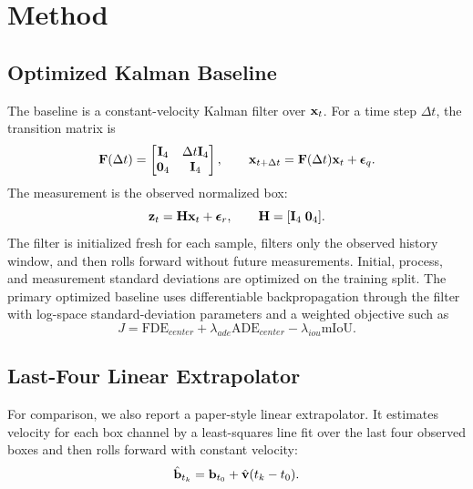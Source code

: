 \section{Method}

\subsection{Optimized Kalman Baseline}

The baseline is a constant-velocity Kalman filter over $\mathbf{x}_t$. For a time step $\Delta t$, the transition matrix is
\begin{equation}
  \mathbf{F}(\Delta t) =
  \begin{bmatrix}
    \mathbf{I}_4 & \Delta t \mathbf{I}_4 \\
    \mathbf{0}_4 & \mathbf{I}_4
  \end{bmatrix},
  \qquad
  \mathbf{x}_{t+\Delta t} = \mathbf{F}(\Delta t)\mathbf{x}_t + \boldsymbol{\epsilon}_q.
\end{equation}
The measurement is the observed normalized box:
\begin{equation}
  \mathbf{z}_t = \mathbf{H}\mathbf{x}_t + \boldsymbol{\epsilon}_r,
  \qquad
  \mathbf{H} = [\mathbf{I}_4 \; \mathbf{0}_4].
\end{equation}
The filter is initialized fresh for each sample, filters only the observed history window, and then rolls forward without future measurements. Initial, process, and measurement standard deviations are optimized on the training split. The primary optimized baseline uses differentiable backpropagation through the filter with log-space standard-deviation parameters and a weighted objective such as
\begin{equation}
  J = \mathrm{FDE}_{center} + \lambda_{ade}\mathrm{ADE}_{center}
      - \lambda_{iou}\mathrm{mIoU}.
\end{equation}

\subsection{Last-Four Linear Extrapolator}

For comparison, we also report a paper-style linear extrapolator. It estimates velocity for each box channel by a least-squares line fit over the last four observed boxes and then rolls forward with constant velocity:
\begin{equation}
  \hat{\mathbf{b}}_{t_k} = \mathbf{b}_{t_0} + \hat{\mathbf{v}}(t_k - t_0).
\end{equation}

